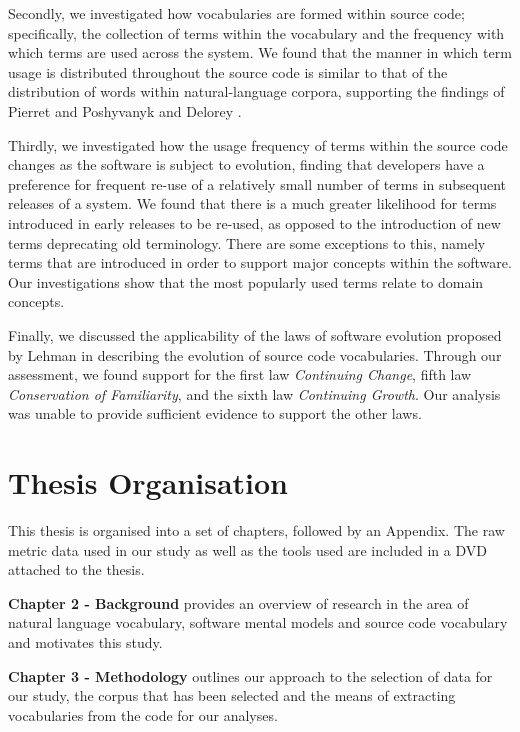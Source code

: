 Secondly, we investigated how vocabularies are formed within source code; specifically, the collection of terms within the vocabulary and the frequency with which terms are used across the system. We found that the manner in which term usage is distributed throughout the source code is similar to that of the distribution of words within natural-language corpora, supporting the findings of Pierret and Poshyvanyk \cite{Pierret09a} and Delorey \etal \cite{Delorey09a}.

Thirdly, we investigated how the usage frequency of terms within the source code changes as the software is subject to evolution, finding that developers have a preference for frequent re-use of a relatively small number of terms in subsequent releases of a system. We found that there is a much greater likelihood for terms introduced in early releases to be re-used, as opposed to the introduction of new terms deprecating old terminology. There are some exceptions to this, namely terms that are introduced in order to support major concepts within the software. Our investigations show that the most popularly used terms relate to domain concepts.

Finally, we discussed the applicability of the laws of software evolution proposed by Lehman \cite{Lehman80a,Lehman97a} in describing the evolution of source code vocabularies. Through our assessment, we found support for the first law \emph{Continuing Change}, fifth law \emph{Conservation of Familiarity}, and the sixth law \emph{Continuing Growth}. Our analysis was unable to provide sufficient evidence to support the other laws.



\section{Thesis Organisation} %
\label{sec:thesis_organisation}

This thesis is organised into a set of chapters, followed by an Appendix. The raw metric data used in our study as well as the tools used are included in a DVD attached to the thesis.

\textbf{Chapter 2 - Background} provides an overview of research in the area of natural language vocabulary, software mental models and source code vocabulary and motivates this study.

\textbf{Chapter 3 - Methodology} outlines our approach to the selection of data for our study, the corpus that has been selected and the means of extracting vocabularies from the code for our analyses.

